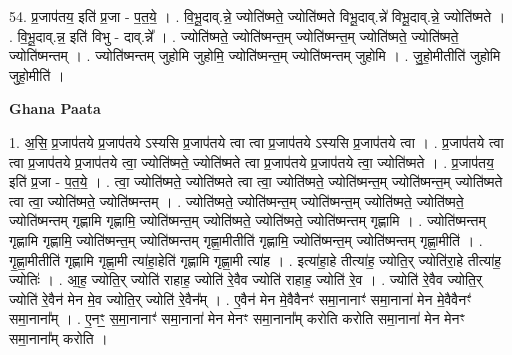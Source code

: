 \documentclass[17pt]{extarticle}
\begin{document}
54. प्र॒जाप॑तय॒ इति॑ प्र॒जा - प॒त॒ये॒ । . वि॒भू॒दाव्.न्ने॒ ज्योति॑ष्मते॒ ज्योति॑ष्मते विभू॒दाव्.न्ने॑ विभू॒दाव्.न्ने॒ ज्योति॑ष्मते । . वि॒भू॒दाव्.न्न॒ इति॑ विभु - दाव्.न्ने᳚ । . ज्योति॑ष्मते॒ ज्योति॑ष्मन्त॒म् ज्योति॑ष्मन्त॒म् ज्योति॑ष्मते॒ ज्योति॑ष्मते॒ ज्योति॑ष्मन्तम् । . ज्योति॑ष्मन्तम् जुहोमि जुहोमि॒ ज्योति॑ष्मन्त॒म् ज्योति॑ष्मन्तम् जुहोमि । . जु॒हो॒मीतीति॑ जुहोमि जुहो॒मीति॑ । \newline

\textbf{Ghana Paata } \newline

1. अ॒सि॒ प्र॒जाप॑तये प्र॒जाप॑तये ऽस्यसि प्र॒जाप॑तये त्वा त्वा प्र॒जाप॑तये ऽस्यसि प्र॒जाप॑तये त्वा । . प्र॒जाप॑तये त्वा त्वा प्र॒जाप॑तये प्र॒जाप॑तये त्वा॒ ज्योति॑ष्मते॒ ज्योति॑ष्मते त्वा प्र॒जाप॑तये प्र॒जाप॑तये त्वा॒ ज्योति॑ष्मते । . प्र॒जाप॑तय॒ इति॑ प्र॒जा - प॒त॒ये॒ । . त्वा॒ ज्योति॑ष्मते॒ ज्योति॑ष्मते त्वा त्वा॒ ज्योति॑ष्मते॒ ज्योति॑ष्मन्त॒म् ज्योति॑ष्मन्त॒म् ज्योति॑ष्मते त्वा त्वा॒ ज्योति॑ष्मते॒ ज्योति॑ष्मन्तम् । . ज्योति॑ष्मते॒ ज्योति॑ष्मन्त॒म् ज्योति॑ष्मन्त॒म् ज्योति॑ष्मते॒ ज्योति॑ष्मते॒ ज्योति॑ष्मन्तम् गृह्णामि गृह्णामि॒ ज्योति॑ष्मन्त॒म् ज्योति॑ष्मते॒ ज्योति॑ष्मते॒ ज्योति॑ष्मन्तम् गृह्णामि । . ज्योति॑ष्मन्तम् गृह्णामि गृह्णामि॒ ज्योति॑ष्मन्त॒म् ज्योति॑ष्मन्तम् गृह्णा॒मीतीति॑ गृह्णामि॒ ज्योति॑ष्मन्त॒म् ज्योति॑ष्मन्तम् गृह्णा॒मीति॑ । . गृ॒ह्णा॒मीतीति॑ गृह्णामि गृह्णा॒मी त्या॑हा॒हेति॑ गृह्णामि गृह्णा॒मी त्या॑ह । . इत्या॑हा॒हे तीत्या॑ह॒ ज्योति॒र् ज्योति॑रा॒हे तीत्या॑ह॒ ज्योतिः॑ । . आ॒ह॒ ज्योति॒र् ज्योति॑ राहाह॒ ज्योति॑ रे॒वैव ज्योति॑ राहाह॒ ज्योति॑ रे॒व । . ज्योति॑ रे॒वैव ज्योति॒र् ज्योति॑ रे॒वैन॑ मेन मे॒व ज्योति॒र् ज्योति॑ रे॒वैन᳚म् । . ए॒वैन॑ मेन मे॒वैवैनꣳ॑ समा॒नानाꣳ॑ समा॒नाना॑ मेन मे॒वैवैनꣳ॑ समा॒नाना᳚म् । . ए॒नꣳ॒॒ स॒मा॒नानाꣳ॑ समा॒नाना॑ मेन मेनꣳ समा॒नाना᳚म् करोति करोति समा॒नाना॑ मेन मेनꣳ समा॒नाना᳚म् करोति । \newline
\end{document}
